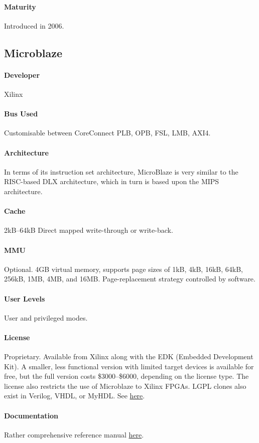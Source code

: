\paragraph{Maturity} Introduced in 2006.

\subsection{Microblaze}
\paragraph{Developer} Xilinx
\paragraph{Bus Used} Customisable between CoreConnect PLB, OPB, FSL, LMB, AXI4.
\paragraph{Architecture} In terms of its instruction set architecture, MicroBlaze is very similar to the RISC-based DLX architecture, which in turn is based upon the MIPS architecture.
\paragraph{Cache} 2kB--64kB Direct mapped write-through or write-back.
\paragraph{MMU} Optional. 4GB virtual memory, supports page sizes of 1kB, 4kB, 16kB, 64kB, 256kB, 1MB, 4MB, and 16MB. Page-replacement strategy controlled by software.
\paragraph{User Levels} User and privileged modes.
\paragraph{License} Proprietary. Available from Xilinx along with the EDK (Embedded Development Kit). A smaller, less functional version with limited target devices is available for free, but the full version costs \$3000--\$6000, depending on the license type. The license also restricts the use of Microblaze to Xilinx FPGAs. LGPL clones also exist in Verilog, VHDL, or MyHDL. See \href{http://en.wikipedia.org/wiki/MicroBlaze#Clones}{here}.
\paragraph{Documentation} Rather comprehensive reference manual \href{http://www.xilinx.com/support/documentation/sw_manuals/xilinx11/mb_ref_guide.pdf}{here}.
